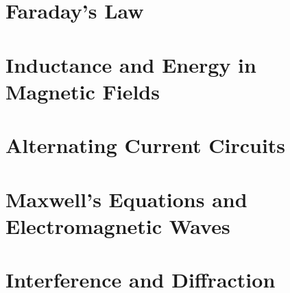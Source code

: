 \section{Faraday's Law}
\section{Inductance and Energy in Magnetic Fields}
\section{Alternating Current Circuits}
\section{Maxwell's Equations and Electromagnetic Waves}
\section{Interference and Diffraction}



